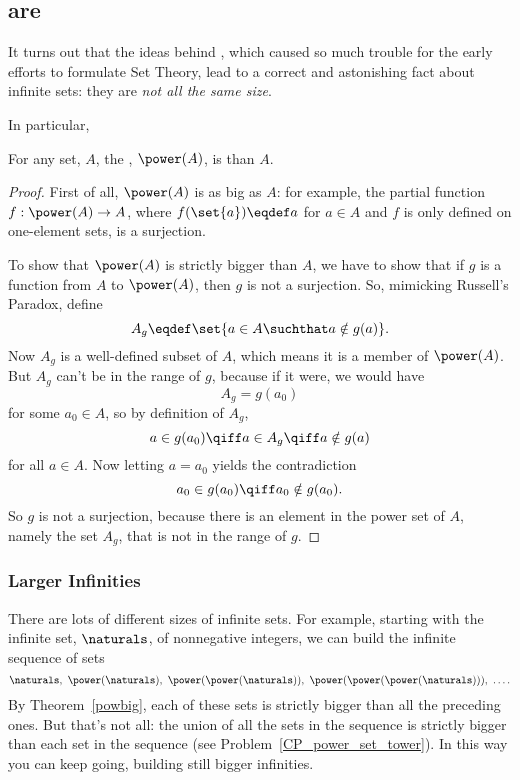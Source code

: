 \subsection{ are }

It turns out that the ideas behind , which caused
so much trouble for the early efforts to formulate Set Theory, lead to a
correct and astonishing fact about infinite sets: they are \emph{not all
  the same size}.

In particular,
\begin{theorem}\label{powbig}
For any set, $A$, the , $\power(A)$, is  than $A$.
\end{theorem}
\begin{proof}
  First of all, $\power(A)$ is as big as $A$: for example, the partial
  function $f:\power(A) \to A$, where $f(\set{a}) \eqdef a$ for $a \in A$
  and $f$ is only defined on one-element sets, is a surjection.

  To show that $\power(A)$ is strictly bigger than $A$, we have to show
  that if $g$ is a function from $A$ to $\power(A)$, then $g$ is not a
  surjection.  So, mimicking Russell's Paradox, define
  \[
  A_g \eqdef \set{a \in A \suchthat a \notin g(a)}.
  \]
  Now $A_g$ is a well-defined subset of $A$, which means it is a member of
  $\power(A)$.  But $A_g$ can't be in the range of $g$, because if it
  were, we would have
\[
A_g = g(a_0)
\]
for some $a_0 \in A$, so by definition of $A_g$,
\[
a \in g(a_0) \qiff a \in A_g \qiff a \notin g(a)
\]
for all $a \in A$.  Now letting $a = a_0$ yields the contradiction
\[
a_0 \in g(a_0) \qiff a_0 \notin g(a_0).
\]
So $g$ is not a surjection, because there is an element in the power set
of $A$, namely the set $A_g$, that is not in the range of $g$.
\end{proof}

\subsubsection{Larger Infinities}

There are lots of different sizes of infinite sets.  For example, starting
with the infinite set, $\naturals$, of nonnegative integers, we can build
the infinite sequence of sets
\[
\naturals,\ \power(\naturals),\ \power(\power(\naturals)),\
\power(\power(\power(\naturals))),\ \dots.
\]
By Theorem~\ref{powbig}, each of these sets is strictly bigger than all
the preceding ones.  But that's not all: the union of all the sets in the
sequence is strictly bigger than each set in the sequence
(see Problem~\ref{CP_power_set_tower}).  In this way you can keep going,
building still bigger infinities.

